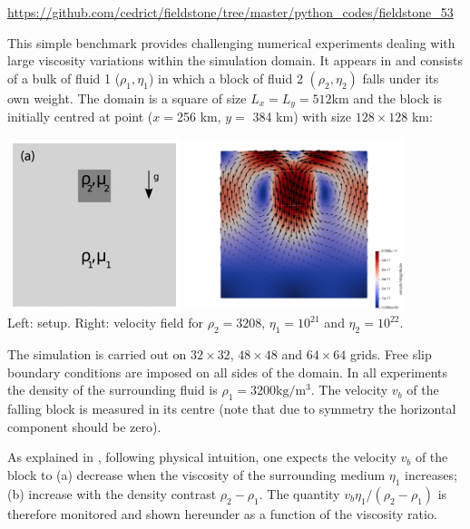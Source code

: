 \url{https://github.com/cedrict/fieldstone/tree/master/python_codes/fieldstone_53}

\vspace{1cm}

This simple benchmark provides challenging numerical experiments 
dealing with large viscosity variations within the simulation
domain. It appears in \cite{gery10} and consists of a bulk of fluid 1 ($\rho_1,\eta_1$)
in which a block of fluid 2 $(\rho_2,\eta_2)$ falls under its own
weight. The domain is a square of size $L_x=L_y=512$km and the
block is initially centred at point ($x=$256 km, $y=$ 384 km) with size
$128\times 128$ km:

\begin{center}
\includegraphics[height=5cm]{python_codes/fieldstone_53/images/setup}
\includegraphics[height=5cm]{python_codes/fieldstone_53/images/vel}\\
{\small Left: setup. Right: velocity field for $\rho_2=3208$, $\eta_1=10^{21}$
and $\eta_2=10^{22}$.}
\end{center}

The simulation is carried out on $32\times32$, $48\times48$ and $64\times 64$ grids. Free slip
boundary conditions are imposed on all sides of the domain. 
In all experiments the density of the surrounding fluid is $\rho_1=3200\text{kg}/\text{m}^3$.
The velocity $v_b$ of the falling block is measured in its centre (note that due to symmetry 
the horizontal component should be zero).

As explained in \cite{thie11}, following physical intuition, one expects 
the velocity $v_b$ of the block to (a) decrease when the viscosity
of the surrounding medium $\eta_1$ increases; (b) increase with the
density contrast $\rho_2-\rho_1$. 
The quantity $v_b \eta_1/(\rho_2-\rho_1)$ is therefore monitored and shown hereunder as a function of 
the viscosity ratio.


